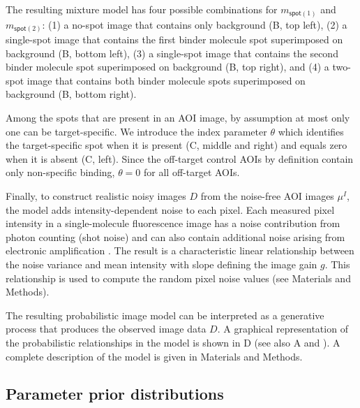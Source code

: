 The resulting mixture model has four possible combinations for $m_{\mathsf{spot}(1)}$ and $m_{\mathsf{spot}(2)}$: (1) a no-spot image that contains only background (B, top left), (2) a single-spot image that contains the first binder molecule spot superimposed on background (B, bottom left), (3) a single-spot image that contains the second binder molecule spot superimposed on background (B, top right), and (4) a two-spot image that contains both binder molecule spots superimposed on background (B, bottom right).

Among the spots that are present in an AOI image, by assumption at most only one can be target-specific. We introduce the index parameter $\theta$ which identifies the target-specific spot  when it is present (C, middle and right) and equals zero when it is absent (C, left). Since the off-target control AOIs by definition contain only non-specific binding, $\theta = 0$ for all off-target AOIs. 

Finally, to construct realistic noisy images $D$ from the noise-free AOI images $\mu^I$, the model adds intensity-dependent noise to each pixel.  Each measured pixel intensity in a single-molecule fluorescence image has a noise contribution from photon counting (shot noise) and can also contain additional noise arising from electronic amplification \citep{Van_Vliet1998-jk}. The result is a characteristic linear relationship between the noise variance and mean intensity with slope defining the image gain $g$. This relationship is used to compute the random pixel noise values (see Materials and Methods).

The resulting probabilistic image model can be interpreted as a generative process that produces the observed image data $D$. A graphical representation of the probabilistic relationships in the model is shown in D (see also A and ). A complete description of the model is given in Materials and Methods.  

\subsection{Parameter prior distributions}

